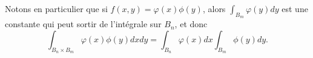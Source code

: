Notons en particulier que si \( f(x,y)=\varphi(x)\phi(y)\), alors \( \int_{B_m}\varphi(y)dy\) est une constante qui peut sortir de l'intégrale sur \( B_n\), et donc
\begin{equation}		\label{EqFubiniFactori}
	\int_{B_n\times B_m}\varphi(x)\phi(y)dxdy=\int_{B_n}\varphi(x)dx\int_{B_m}\phi(y)dy.
\end{equation}

